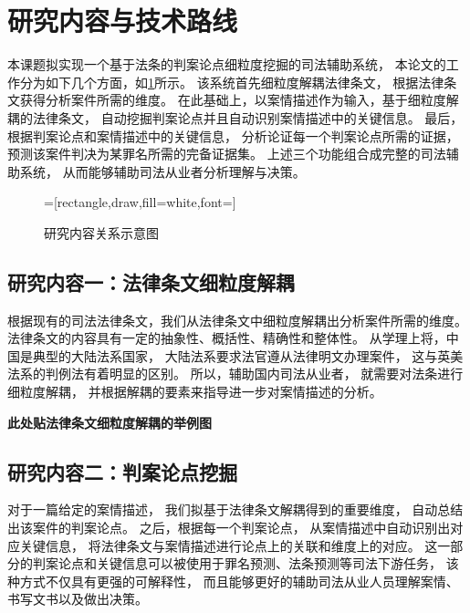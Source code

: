 \section{研究内容与技术路线}

本课题拟实现一个基于法条的判案论点细粒度挖掘的司法辅助系统，
本论文的工作分为如下几个方面，如\cref{fig_1}所示。
该系统首先细粒度解耦法律条文，
根据法律条文获得分析案件所需的维度。
在此基础上，以案情描述作为输入，基于细粒度解耦的法律条文，
自动挖掘判案论点并且自动识别案情描述中的关键信息。
最后，根据判案论点和案情描述中的关键信息，
分析论证每一个判案论点所需的证据，
预测该案件判决为某罪名所需的完备证据集。
上述三个功能组合成完整的司法辅助系统，
从而能够辅助司法从业者分析理解与决策。
\begin{figure}[h]
	\centering

	\scriptsize
	=[rectangle,draw,fill=white,font=\fontsize{12pt}{18pt}\selectfont]
	\caption{研究内容关系示意图}
	\label{fig_1}
\end{figure}

\subsection{研究内容一：法律条文细粒度解耦}
根据现有的司法法律条文，我们从法律条文中细粒度解耦出分析案件所需的维度。
法律条文的内容具有一定的抽象性、概括性、精确性和整体性。
从学理上将，中国是典型的大陆法系国家，
大陆法系要求法官遵从法律明文办理案件，
这与英美法系的判例法有着明显的区别。
所以，辅助国内司法从业者，
就需要对法条进行细粒度解耦，
并根据解耦的要素来指导进一步对案情描述的分析。

\textbf{\color{red} 此处贴法律条文细粒度解耦的举例图}

\subsection{研究内容二：判案论点挖掘}
对于一篇给定的案情描述，
我们拟基于法律条文解耦得到的重要维度，
自动总结出该案件的判案论点。
之后，根据每一个判案论点，
从案情描述中自动识别出对应关键信息，
将法律条文与案情描述进行论点上的关联和维度上的对应。
这一部分的判案论点和关键信息可以被使用于罪名预测、法条预测等司法下游任务，
该种方式不仅具有更强的可解释性，
而且能够更好的辅助司法从业人员理解案情、书写文书以及做出决策。

